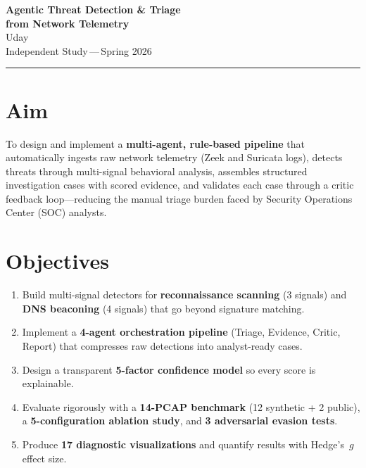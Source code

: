 \documentclass[11pt, a4paper]{article}
\begin{document}
\begin{center}
    {\LARGE\bfseries\color{secblue} Agentic Threat Detection \& Triage\\[4pt]
    from Network Telemetry}\\[16pt]
    {\large Uday}\\[4pt]
    {\normalsize Independent Study\,---\,Spring 2026}\\[4pt]
\end{center}

\vspace{-4pt}
\noindent\rule{\textwidth}{0.8pt}
\vspace{6pt}

\section{Aim}

To design and implement a \textbf{multi-agent, rule-based pipeline} that automatically
ingests raw network telemetry (Zeek and Suricata logs), detects threats through
multi-signal behavioral analysis, assembles structured investigation cases with
scored evidence, and validates each case through a critic feedback loop---reducing
the manual triage burden faced by Security Operations Center (SOC) analysts.

\section{Objectives}

\begin{enumerate}[leftmargin=*, itemsep=2pt]
    \item Build multi-signal detectors for \textbf{reconnaissance scanning} (3 signals) and \textbf{DNS beaconing} (4 signals) that go beyond signature matching.
    \item Implement a \textbf{4-agent orchestration pipeline} (Triage, Evidence, Critic, Report) that compresses raw detections into analyst-ready cases.
    \item Design a transparent \textbf{5-factor confidence model} so every score is explainable.
    \item Evaluate rigorously with a \textbf{14-PCAP benchmark} (12 synthetic + 2 public), a \textbf{5-configuration ablation study}, and \textbf{3 adversarial evasion tests}.
    \item Produce \textbf{17 diagnostic visualizations} and quantify results with Hedge's~$g$ effect size.
\end{enumerate}
\end{document}
